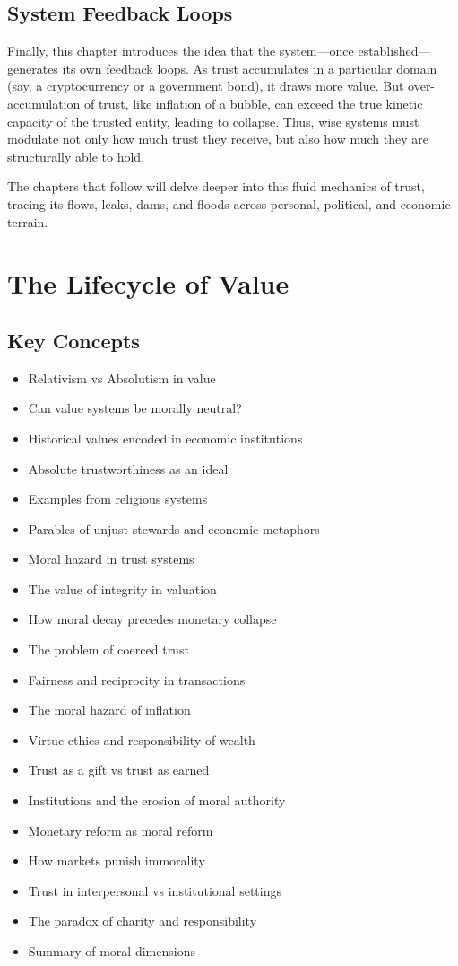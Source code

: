 \documentclass[11pt,oneside]{book}
\begin{document}
\section{System Feedback Loops}

Finally, this chapter introduces the idea that the system—once established—generates its own feedback loops. As trust accumulates in a particular domain (say, a cryptocurrency or a government bond), it draws more value. But over-accumulation of trust, like inflation of a bubble, can exceed the true kinetic capacity of the trusted entity, leading to collapse. Thus, wise systems must modulate not only how much trust they receive, but also how much they are structurally able to hold.

The chapters that follow will delve deeper into this fluid mechanics of trust, tracing its flows, leaks, dams, and floods across personal, political, and economic terrain.


\chapter{ The Lifecycle of Value}

\section{Key Concepts}

\begin{itemize}
\item Relativism vs Absolutism in value
\item Can value systems be morally neutral?
\item Historical values encoded in economic institutions
\item Absolute trustworthiness as an ideal
\item Examples from religious systems
\item Parables of unjust stewards and economic metaphors
\item Moral hazard in trust systems
\item The value of integrity in valuation
\item How moral decay precedes monetary collapse
\item The problem of coerced trust
\item Fairness and reciprocity in transactions
\item The moral hazard of inflation
\item Virtue ethics and responsibility of wealth
\item Trust as a gift vs trust as earned
\item Institutions and the erosion of moral authority
\item Monetary reform as moral reform
\item How markets punish immorality
\item Trust in interpersonal vs institutional settings
\item The paradox of charity and responsibility
\item Summary of moral dimensions
\end{itemize}
\end{document}
